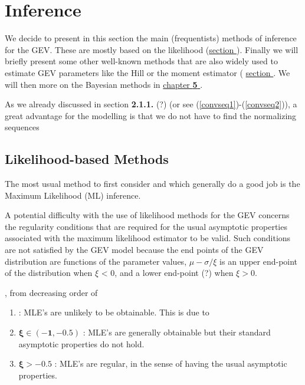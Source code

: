 \documentclass[11pt,a4paper,openany ]{book}
\begin{document}
\section{Inference}\label{sec::gevinfernce} 


We decide to present in this section the main (frequentists) methods of inference for the GEV. These are mostly based on the likelihood (\hyperref[likintro]{section }). Finally we will briefly present some other well-known methods that are also widely used to estimate GEV parameters like the Hill or the moment estimator ( \hyperref[gev:other]{section }. We will then more on the Bayesian methods in \hyperref[sec:bayesian]{chapter \textbf{5} }.
 
As we already discussed in section \textbf{2.1.1.} (?) (or see (\ref{convseq1})-(\ref{convseq2})), a great advantage for the modelling is that we do not have to find the normalizing sequences



\subsection{Likelihood-based Methods}\label{likintro}

The most usual method to first consider and which generally do a good job is the Maximum Likelihood (ML) inference.

A potential difficulty with the use of likelihood methods for the GEV concerns the regularity conditions that are required for the usual asymptotic properties associated with the
maximum likelihood estimator to be valid. Such conditions are not satisfied by the GEV
model because the end points of the GEV distribution are functions of the parameter values,
$\mu-\sigma/\xi$ is an upper end-point of the distribution when $\xi$ < 0, and a lower end-point (?) when
$\xi > 0$. \citet{saeb_general_2014}


, from decreasing order of 
\citet[pp.55]{coles_introduction_2001}

\begin{enumerate}
	\item\label{it1lik}  : MLE's are unlikely to be obtainable. This is due to 
	\item $\boldsymbol{\xi\in(-1,-0.5)}$ : MLE's are generally obtainable but their standard asymptotic properties do not hold.
	\item $\boldsymbol{\xi>-0.5}$ : MLE's are regular, in the sense of having the usual asymptotic properties.
\end{enumerate}
\end{document}
